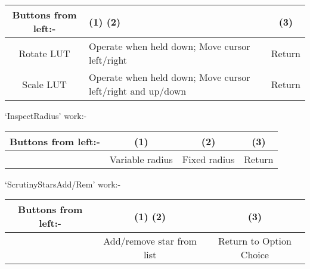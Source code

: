 {{\hspace*{4ex}\begin{tabular}{|c|p{3in}|c|}\hline
  Buttons from left:-   & (1)      \hspace{6ex}  (2) &       (3) \\ \hline
       Rotate LUT       &   Operate when held down; Move cursor left/right   &   
Return \\
       Scale  LUT      &    Operate when held down; Move cursor left/right and up/down 
                                                    &      Return \\ \hline
\end{tabular}                             
                                
                                                                               
 `Inspect{\undersc}Radius' work:-
                                                                               
\hspace*{4ex}\begin{tabular}{|c|c|c|c|}\hline
  Buttons from left:-   & (1)      & (2) &       (3) \\ \hline
   &                      Variable radius   & Fixed radius    & Return \\ \hline
\end{tabular}                                                                               

  `Scrutiny{\undersc}Stars{\undersc}Add/Rem' work:-
                                                                               
\hspace*{4ex}\begin{tabular}{|c|c|c|}\hline
  Buttons from left:-   & (1)  \hspace*{6ex} (2) &       (3) \\ \hline
     & Add/remove star from list & Return to Option Choice \\ \hline
\end{tabular}
                                                                               
}}
